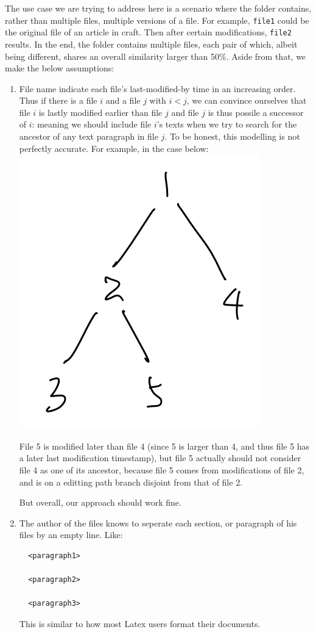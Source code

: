 \documentclass{article}
\begin{document}
The use case we are trying to address here is a scenario where the folder contains, rather than multiple files, multiple versions of a file. For example, \texttt{file1} could be the original file of an article in craft. Then after certain modifications, \texttt{file2} results. In the end, the folder contains multiple files, each pair of which, albeit being different, shares an overall similarity larger than 50\%. Aside from that, we make the below assumptions:
\begin{enumerate}
  \item File name indicate each file's last-modified-by time in an increasing order. Thus if there is a file $i$ and a file $j$ with $i<j$, we can convince ourselves that file $i$ is lastly modified earlier than file $j$ and file $j$ is thus possile a successor of $i$: meaning we should include file $i$'s texts when we try to search for the ancestor of any text paragraph in file $j$. To be honest, this modelling is not perfectly accurate. For example, in the case below:\\
  \includegraphics[scale=0.3,center]{pic1.png}

  File 5 is modified later than file 4 (since 5 is larger than 4, and thus file 5 has a later last modification timestamp), but file 5 actually should not consider file 4 as one of its ancestor, because file 5 comes from modifications of file 2, and is on a editting path branch disjoint from that of file 2. 

  But overall, our approach should work fine. 
  \item The author of the files knows to seperate each section, or paragraph of his files by an empty line. Like:
  \begin{lstlisting}
  <paragraph1>

  <paragraph2>

  <paragraph3>
  \end{lstlisting}
  This is similar to how most Latex users format their documents. 
\end{enumerate}
\end{document}
